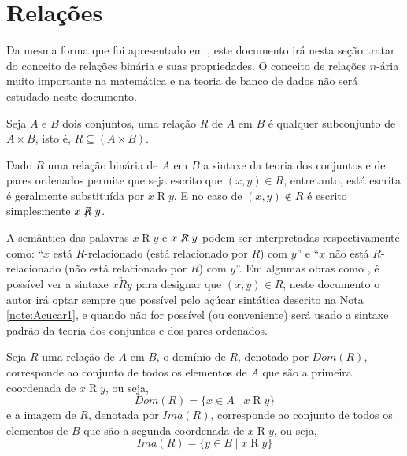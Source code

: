 \section{Relações}\label{sec:Relacoes}

Da mesma forma que foi apresentado em \cite{abe1991-TC}, este documento irá nesta seção tratar do conceito de relações binária e suas propriedades. O conceito de relações $n$-ária muito importante na matemática e na teoria de banco de dados não será estudado neste documento.

\begin{definicao}\label{def:RelacaoBinaria}
	Seja $A$ e $B$ dois conjuntos, uma relação $R$ de $A$ em $B$ é qualquer subconjunto de $A \times B$, isto é, $R \subseteq (A \times B)$.
\end{definicao}

\begin{nota}\label{note:Acucar1}
  Dado $R$ uma relação binária de $A$ em $B$ a sintaxe da teoria dos conjuntos e de pares ordenados permite que seja escrito que $(x, y) \in R$, entretanto, está escrita é geralmente substituída por $x\mathrel{R}y$. E no caso de $(x,y) \notin R$ é escrito simplesmente $x\centernot{R}y$.
\end{nota}

A semântica das palavras $x\mathrel{R}y$ e $x\centernot{R}y$ podem ser interpretadas respectivamente como: ``$x$ está $R$-relacionado (está relacionado por $R$) com $y$'' e ``$x$ não está $R$-relacionado (não está relacionado por $R$) com $y$''. Em algumas obras como \cite{carmo2013}, é possível ver a sintaxe $x \underrightarrow{R} y$ para designar que $(x, y) \in R$, neste documento o autor irá optar sempre que possível pelo açúcar sintática descrito na Nota \ref{note:Acucar1}, e quando não for possível (ou conveniente) será usado a sintaxe padrão da teoria dos conjuntos e dos pares ordenados.

\begin{definicao}\label{def:DominioImagemRelacoes}
	Seja $R$ uma relação de $A$ em $B$, o domínio de $R$, denotado por $Dom(R)$, corresponde ao conjunto de todos os elementos de $A$ que são a primeira coordenada de $x\mathrel{R}y$, ou seja, 
	$$Dom(R) = \{x \in A \mid x\mathrel{R}y\}$$
	e a imagem de $R$, denotada por $Ima(R)$, corresponde ao conjunto de todos os elementos de $B$ que são a segunda coordenada de $x\mathrel{R}y$, ou seja, 
	$$Ima(R) = \{y \in B \mid x\mathrel{R}y\}$$
\end{definicao}

